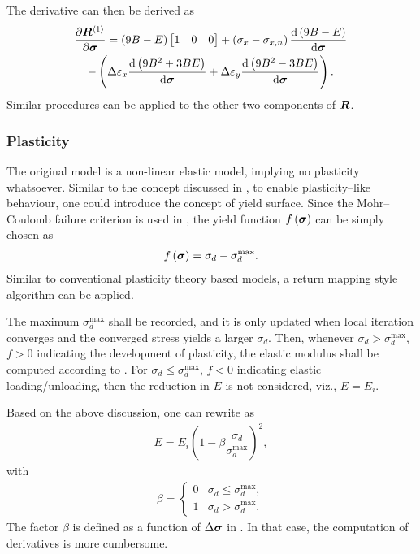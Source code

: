 The derivative can then be derived as
\begin{multline}
\dfrac{\partial{\bm{R}^{\left\langle1\right\rangle}}}{\partial{\bm{\sigma}}}=\left(9B-E\right)\begin{bmatrix}
1&0&0
\end{bmatrix}+\left(\sigma_x-\sigma_{x,n}\right)\dfrac{\mathrm{d}\left(9B-E\right)}{\mathrm{d}\bm{\sigma}}\\-\left(\Delta\varepsilon_x\dfrac{\mathrm{d}\left(9B^2+3BE\right)}{\mathrm{d}\bm{\sigma}}+\Delta\varepsilon_y\dfrac{\mathrm{d}\left(9B^2-3BE\right)}{\mathrm{d}\bm{\sigma}}\right).
\end{multline}
Similar procedures can be applied to the other two components of $\bm{R}$.
\subsubsection{Plasticity}
The original model is a non-linear elastic model, implying no plasticity whatsoever.
Similar to the concept discussed in \cite{Katona2015}, to enable plasticity--like behaviour, one could introduce the concept of yield surface. Since the Mohr--Coulomb failure criterion is used in , the yield function $f\left(\bm{\sigma}\right)$ can be simply chosen as
\begin{gather}
f\left(\bm{\sigma}\right)=\sigma_d-\sigma_d^\text{max}.
\end{gather}
Similar to conventional plasticity theory based models, a return mapping style algorithm can be applied.

The maximum $\sigma_d^\text{max}$ shall be recorded, and it is only updated when local iteration converges and the converged stress yields a larger $\sigma_d$.
Then, whenever $\sigma_d>\sigma_d^\text{max}$, $f>0$ indicating the development of plasticity, the elastic modulus shall be computed according to .
For $\sigma_d\leqslant\sigma_d^\text{max}$, $f<0$ indicating elastic loading/unloading, then the reduction in $E$ is not considered, viz., $E=E_i$.

Based on the above discussion, one can rewrite  as
\begin{gather}
E=E_i\left(1-\beta\dfrac{\sigma_d}{\sigma_d^{\text{max}}}\right)^2,
\end{gather}
with
\begin{gather}
\beta=\left\{\begin{array}{ll}
0&\sigma_d\leqslant\sigma_d^\text{max},\\
1&\sigma_d>\sigma_d^\text{max}.
\end{array}\right.
\end{gather}
The factor $\beta$ is defined as a function of $\Delta\bm{\sigma}$ in \cite{Katona2015}. In that case, the computation of derivatives is more cumbersome.
